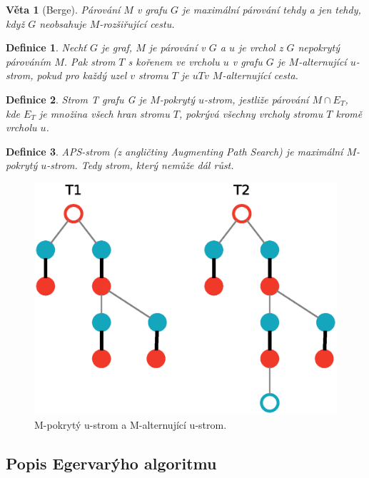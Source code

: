 \documentclass[a4paper, 11pt, titlepage, final]{article}[3. prosinec 2011]
\newtheorem{Veta}{Věta}
\newtheorem{Definice}{Definice}
\begin{document}
\begin{Veta}[Berge] \label{Berge}
Párování $M$ v grafu $G$ je maximální párování tehdy a jen tehdy, když $G$ neobsahuje $M$-rozšiřující cestu. 
\end{Veta}

\begin{Definice}
Nechť $G$ je graf, $M$ je párování v $G$ a $u$ je vrchol z $G$ nepokrytý párováním $M$. Pak strom $T$ s kořenem ve vrcholu $u$ v grafu $G$ je \textit{$M$-alternující $u$-strom}, pokud pro každý uzel $v$ stromu $T$ je $uTv$ $M$-alternující cesta.
\end{Definice}

\begin{Definice}
Strom T grafu G je \textit{$M$-pokrytý $u$-strom}, jestliže párování $M \cap E_T$, kde $E_T$ je množina všech hran stromu $T$, pokrývá všechny vrcholy stromu $T$ kromě vrcholu $u$.
\end{Definice}

\begin{Definice}
\textit{APS-strom} (z angličtiny Augmenting Path Search) je maximální $M$-pokrytý $u$-strom. Tedy strom, který nemůže dál růst.
\end{Definice}

\begin{figure}[ht]
  \centering
  \includegraphics[scale=0.5]{img/trees.eps}
  \caption{M-pokrytý u-strom a M-alternující u-strom.}
  \label{imgTrees}
\end{figure}


\subsection{Popis Egervarýho algoritmu}
\end{document}
